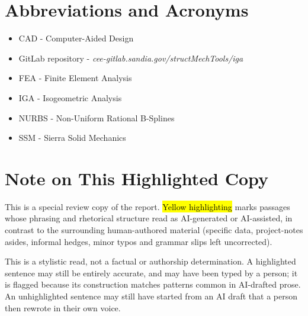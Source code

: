 \documentclass[12pt,report,justified]{SANDreport}
\begin{document}
%
\SANDmain		%

\chapter*{Abbreviations and Acronyms}
\begin{itemize}
\item CAD - Computer-Aided Design
\item GitLab repository - {\em cee-gitlab.sandia.gov/structMechTools/iga}
\item FEA - Finite Element Analysis
\item IGA - Isogeometric Analysis
\item NURBS - Non-Uniform Rational B-Splines
\item SSM - Sierra Solid Mechanics
\end{itemize}

\chapter*{Note on This Highlighted Copy}

This is a special review copy of the report. \hl{Yellow highlighting} marks passages whose phrasing and rhetorical structure read as AI-generated or AI-assisted, in contrast to the surrounding human-authored material (specific data, project-notes asides, informal hedges, minor typos and grammar slips left uncorrected).

This is a stylistic read, not a factual or authorship determination. A highlighted sentence may still be entirely accurate, and may have been typed by a person; it is flagged because its construction matches patterns common in AI-drafted prose. An unhighlighted sentence may still have started from an AI draft that a person then rewrote in their own voice.
\end{document}
